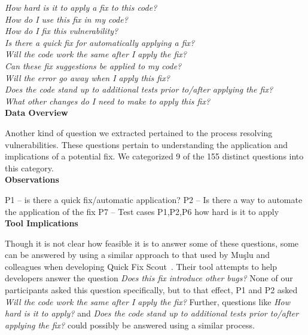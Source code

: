 \documentclass[conference]{IEEEtran}
\begin{document}
\noindent\emph{How hard is it to apply a fix to this code?} \\
\emph{How do I use this fix in my code?} \\
\emph{How do I fix this vulnerability?} \\
\emph{Is there a quick fix for automatically applying a fix?} \\
\emph{Will the code work the same after I apply the fix?} \\
\emph{Can these fix suggestions be applied to my code?} \\
\emph{Will the error go away when I apply this fix?} \\
\emph{Does the code stand up to additional tests prior to/after applying the fix?} \\
\emph{What other changes do I need to make to apply this fix?} \\


\noindent\textbf{Data Overview}

Another kind of question we extracted pertained to the process resolving vulnerabilities. 
These questions pertain to understanding the application and implications of a potential fix. 
We categorized 9 of the 155 distinct questions into this category.
\\

\noindent\textbf{Observations}

P1 -- is there a quick fix/automatic application?
P2 -- Is there a way to automate the application of the fix
P7 -- Test cases
P1,P2,P6 how hard is it to apply
\\

\noindent\textbf{Tool Implications}

Though it is not clear how feasible it is to answer some of these questions, some can be answered by using a similar approach to that used by Mu{\c{s}}lu and colleagues when developing Quick Fix Scout~\cite{mucslu2012speculative}. 
Their tool attempts to help developers answer the question \textit{Does this fix introduce other bugs?} 
None of our participants asked this question specifically, but to that effect, P1 and P2 asked \textit{Will the code work the same after I apply the fix?} 
Further, questions like \textit{How hard is it to apply?} and \textit{Does the code stand up to additional tests prior to/after applying the fix?} could possibly be answered using a similar process.

\end{document}
